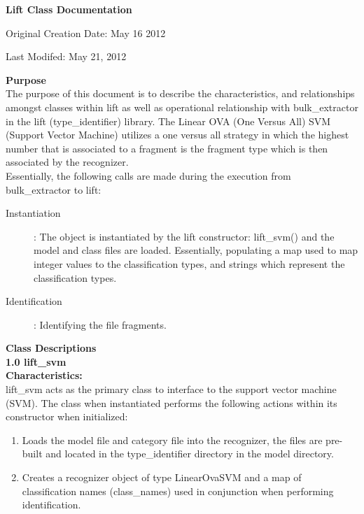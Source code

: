 \documentclass{report}
\begin{document}
\centerline{\sc \large \textbf{Lift Class Documentation}}
\vspace{.5pc}
\centerline{\sc Original Creation Date: May 16 2012}
\centerline{\sc Last Modifed: May 21, 2012}

\textbf{Purpose}\\
The purpose of this document is to describe the characteristics, and relationships amongst classes within lift as well as operational relationship with bulk\_extractor in the lift (type\_identifier) library. The Linear OVA (One Versus All) SVM (Support Vector Machine) utilizes a one versus all strategy in which the highest number that is associated to a fragment is the fragment type which is then associated by the recognizer.
\\
Essentially, the following calls are made during the execution from bulk\_extractor to lift:
\\

\begin{description}
\item[Instantiation]: The object is instantiated by the lift constructor: lift\_svm() and the model and class files are loaded.  Essentially, populating a map used to map integer values to the classification types, and strings which represent the classification types.
\item[Identification]: Identifying the file fragments.
\end{description}

\textbf{Class Descriptions}\\
\textbf{1.0 lift\_svm}\\
\textbf{Characteristics:}\\
lift\_svm acts as the primary class to interface to the support vector machine (SVM). The class when instantiated performs the following actions within its constructor when initialized:

\begin{enumerate}
\item Loads the model file and category file into the recognizer, the files are pre-built and located in the type\_identifier directory in the model directory.
\item Creates a recognizer object of type LinearOvaSVM\* and a map of classification names (class\_names) used in conjunction when performing identification. 
\end{enumerate}
\end{document}
